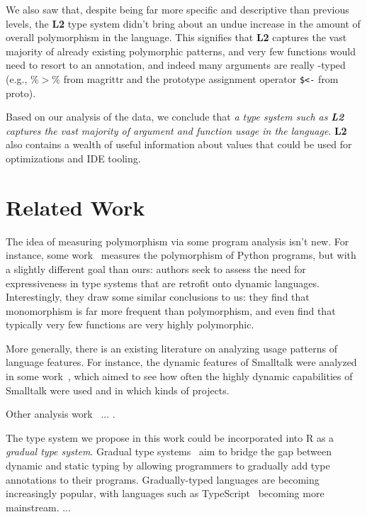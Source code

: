 \documentclass[acmsmall,10pt,review,anonymous]{acmart}\settopmatter{printfolios=true,printccs=false,printacmref=false}
\begin{document}
We also saw that, despite being far more specific and descriptive than previous levels, the {\bf L2} type system didn't bring about an undue increase in the amount of overall polymorphism in the language.
This signifies that {\bf L2} captures the vast majority of already existing polymorphic patterns, and very few functions would need to resort to an \ANY annotation, and indeed many arguments are really \ANY-typed (e.g., \%$>$\% from magrittr and the prototype assignment operator {\tt \$<-} from proto).

Based on our analysis of the data, we conclude that {\it a type system such as} \textbf{\emph{L2}} {\it captures the vast majority of argument and function usage in the language}.
{\bf L2} also contains a wealth of useful information about values that could be used for optimizations and IDE tooling.



%
%
%
%
%

%
%
%
%
\section{Related Work}

The idea of measuring polymorphism via some program analysis isn't new.
For instance, some work~\cite{aakerblom2015measuring} measures the polymorphism of Python programs, but with a slightly different goal than ours: authors seek to assess the need for expressiveness in type systems that are retrofit onto dynamic languages.
Interestingly, they draw some similar conclusions to us: they find that monomorphism is far more frequent than polymorphism, and even find that typically very few functions are very highly polymorphic.

More generally, there is an existing literature on analyzing usage patterns of language features.  
For instance, the dynamic features of Smalltalk were analyzed in some work~\cite{callau2011howdevelopers}, which aimed to see how often the highly dynamic capabilities of Smalltalk were used and in which kinds of projects.


Other analysis work~\cite{milojkovic2017duck} ... .

The type system we propose in this work could be incorporated into R as a {\it gradual type system}.
Gradual type systems~\cite{SiekTaha06} aim to bridge the gap between dynamic and static typing by allowing programmers to gradually add type annotations to their programs.
Gradually-typed languages are becoming increasingly popular, with languages such as TypeScript~\cite{typescript13} becoming more mainstream.
...
\end{document}
